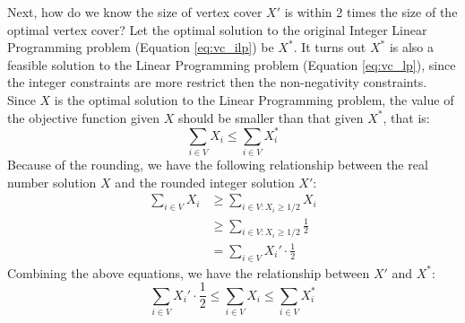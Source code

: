 \documentclass{article}
\begin{document}
Next, how do we know the size of vertex cover $X'$ is within 2 times the size
of the optimal vertex cover?
Let the optimal solution to the original Integer Linear Programming
problem (Equation \ref{eq:vc_ilp}) be $X^{*}$.
It turns out $X^{*}$ is also a feasible solution to the Linear Programming
problem (Equation \ref{eq:vc_lp}), since the integer constraints are
more restrict then the non-negativity constraints. Since $X$ is the optimal
solution to the Linear Programming problem, the value of the objective function
given $X$ should be smaller than that given $X^{*}$, that is:
\begin{equation}
\sum_{i \in V} X_{i} \le \sum_{i \in V} X_{i}^{*}
\end{equation}
Because of the rounding, we have the following relationship between the 
real number solution $X$ and the rounded integer solution $X'$:
\begin{equation}
	\begin{split}
		\sum_{i \in V} X_{i} 
		&\ge \sum_{i \in V:X_i \ge 1/2} X_i\\
		&\ge \sum_{i \in V:X_i \ge 1/2} \frac{1}{2}\\
		&= \sum_{i \in V} X_i'\cdot \frac{1}{2}
	\end{split}
\end{equation}
Combining the above equations, we have the relationship between $X'$ and $X^{*}$:
\begin{equation}
\sum_{i \in V} X_i'\cdot \frac{1}{2} 
\le \sum_{i \in V} X_{i} \le \sum_{i \in V} X_{i}^{*}
\end{equation}
\end{document}
